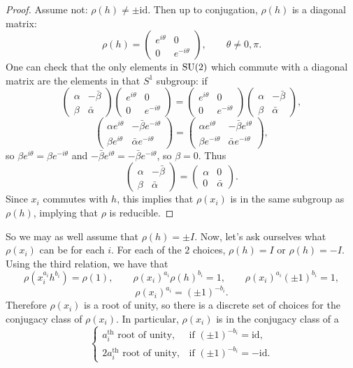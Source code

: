 \documentclass[main]{subfiles}
\begin{document}
\begin{proof}
Assume not: $\rho(h)\neq\pm\mathrm{id}$. Then up to conjugation, $\rho(h)$ is a diagonal matrix:
\[
\rho(h) = \begin{pmatrix}e^{i\theta}&0\\0&e^{-i\theta}\end{pmatrix}, \qquad \theta\neq 0,\pi.
\]
One can check that the only elements in $\operatorname{SU}(2)$ which commute with a diagonal matrix are the elements in that $S^1$ subgroup: if
\[
\begin{pmatrix}\alpha & -\bar\beta\\ \beta & \bar\alpha\end{pmatrix}\begin{pmatrix}e^{i\theta} & 0\\ 0 & e^{-i\theta}\end{pmatrix} = \begin{pmatrix}e^{i\theta} & 0\\ 0 & e^{-i\theta}\end{pmatrix}\begin{pmatrix}\alpha & -\bar\beta\\ \beta & \bar\alpha\end{pmatrix},
\]
\[
\begin{pmatrix}\alpha e^{i\theta} & -\bar\beta e^{-i\theta}\\ \beta e^{i\theta} & \bar\alpha e^{-i\theta}\end{pmatrix} = \begin{pmatrix}\alpha e^{i\theta} & -\bar\beta e^{i\theta}\\ \beta e^{-i\theta} & \bar\alpha e^{-i\theta}\end{pmatrix},
\]
so $\beta e^{i\theta}=\beta e^{-i\theta}$ and $-\bar\beta e^{i\theta} = -\bar\beta e^{-i\theta}$, so $\beta=0$. Thus
\[
\begin{pmatrix}\alpha & -\bar\beta\\ \beta & \bar\alpha\end{pmatrix} = \begin{pmatrix}\alpha & 0\\ 0 & \bar\alpha\end{pmatrix}.
\]
Since $x_i$ commutes with $h$, this implies that $\rho(x_i)$ is in the same subgroup as $\rho(h)$, implying that $\rho$ is reducible. \qedhere
\end{proof}

So we may as well assume that $\rho(h)=\pm I$. Now, let's ask ourselves what $\rho(x_i)$ can be for each $i$. For each of the $2$ choices, $\rho(h)=I$ or $\rho(h)=-I$. Using the third relation, we have that
\[
\rho(x_i^{a_i}h^{b_i}) = \rho(1), \qquad \rho(x_i)^{a_i}\rho(h)^{b_i}=1, \qquad \rho(x_i)^{a_i}(\pm1)^{b_i}=1,
\]
\[
\rho(x_i)^{a_i} = (\pm1)^{-b_i}.
\]
Therefore $\rho(x_i)$ is a root of unity, so there is a discrete set of choices for the conjugacy class of $\rho(x_i)$. In particular, $\rho(x_i)$ is in the conjugacy class of a
\[
\begin{cases} a_i^{\text{th}} \text{ root of unity}, & \text{if } (\pm1)^{-b_i}=\mathrm{id},\\ 2a_i^{\text{th}} \text{ root of unity}, & \text{if } (\pm1)^{-b_i}=-\mathrm{id}.\end{cases}
\]
\end{document}
